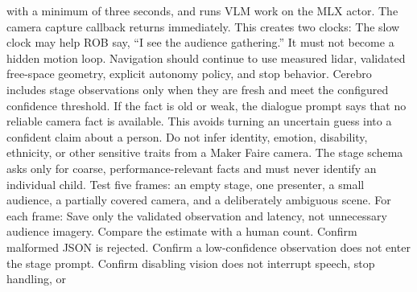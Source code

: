 {}with a minimum of three seconds, and runs VLM work on the MLX actor. The camera\markdownRendererSoftLineBreak
{}capture callback returns immediately. This creates two clocks:\markdownRendererInterblockSeparator
{}\markdownRendererInterblockSeparator
{}The slow clock may help ROB say, “I see the audience gathering.” It must not\markdownRendererSoftLineBreak
{}become a hidden motion loop. Navigation should continue to use measured lidar,\markdownRendererSoftLineBreak
{}validated free-space geometry, explicit autonomy policy, and stop behavior.\markdownRendererInterblockSeparator
{}
\markdownRendererSectionEnd \markdownRendererSectionBegin
{}\markdownRendererInterblockSeparator
{}Cerebro includes stage observations only when they are fresh and meet the\markdownRendererSoftLineBreak
{}configured confidence threshold. If the fact is old or weak, the dialogue\markdownRendererSoftLineBreak
{}prompt says that no reliable camera fact is available. This avoids turning an\markdownRendererSoftLineBreak
{}uncertain guess into a confident claim about a person.\markdownRendererParagraphSeparator
{}Do not infer identity, emotion, disability, ethnicity, or other sensitive\markdownRendererSoftLineBreak
{}traits from a Maker Faire camera. The stage schema asks only for coarse,\markdownRendererSoftLineBreak
{}performance-relevant facts and must never identify an individual child.\markdownRendererInterblockSeparator
{}
\markdownRendererSectionEnd \markdownRendererSectionBegin
{}\markdownRendererInterblockSeparator
{}Test five frames: an empty stage, one presenter, a small audience, a partially\markdownRendererSoftLineBreak
{}covered camera, and a deliberately ambiguous scene. For each frame:\markdownRendererInterblockSeparator
{}\markdownRendererOlBegin
{}Save only the validated observation and latency, not unnecessary audience\markdownRendererSoftLineBreak
{}imagery.\markdownRendererOlItemEnd 
{}Compare the estimate with a human count.\markdownRendererOlItemEnd 
{}Confirm malformed JSON is rejected.\markdownRendererOlItemEnd 
{}Confirm a low-confidence observation does not enter the stage prompt.\markdownRendererOlItemEnd 
{}Confirm disabling vision does not interrupt speech, stop handling, or\markdownRendererSoftLineBreak

